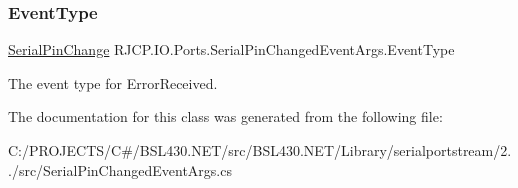 \subsubsection{\texorpdfstring{EventType}{EventType}}
{\footnotesize\ttfamily \mbox{\hyperlink{namespace_r_j_c_p_1_1_i_o_1_1_ports_abe559cc956a8d6ec76d331e52b774a71}{Serial\+Pin\+Change}} R\+J\+C\+P.\+I\+O.\+Ports.\+Serial\+Pin\+Changed\+Event\+Args.\+Event\+Type\hspace{0.3cm}{\ttfamily [get]}}



The event type for Error\+Received. 



The documentation for this class was generated from the following file\+:\begin{DoxyCompactItemize}
\item 
C\+:/\+P\+R\+O\+J\+E\+C\+T\+S/\+C\#/\+B\+S\+L430.\+N\+E\+T/src/\+B\+S\+L430.\+N\+E\+T/\+Library/serialportstream/2../src/Serial\+Pin\+Changed\+Event\+Args.\+cs\end{DoxyCompactItemize}
